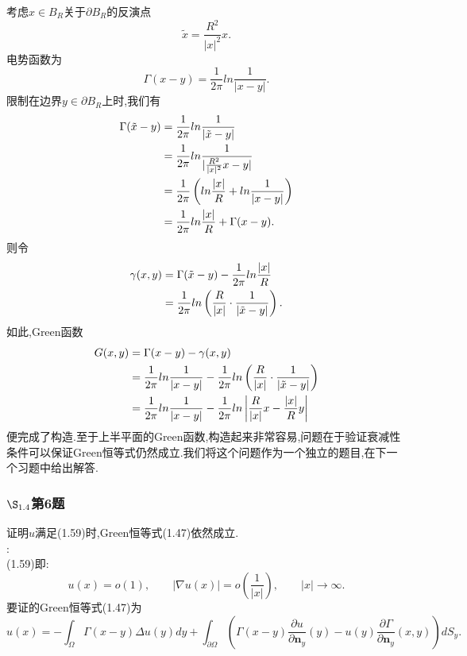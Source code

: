 \documentclass[12pt, a4paper]{ctexart}
\begin{document}
	考虑$x\in B_R$关于$\partial B_R$的反演点$$\tilde{x}=\frac{R^2 }{|x|^2}x.$$
	电势函数为$$
	\Gamma (x-y)=\frac{1}{2\pi}	ln\frac{1}{|x-y|}.$$
	限制在边界$y\in \partial B_R$上时,我们有
	\begin{align}
		\Gamma(\tilde{x}-y)&=\frac{1}{2\pi}	ln\frac{1}{|\tilde{x}-y|} \notag\\
		&=\frac{1}{2\pi} ln\frac{1}{|\frac{R^2 }{|x|^2}x-y|} \notag \\
		&=\frac{1}{2\pi} \left( ln\frac{|x|}{R}+ln \frac{1}{|x-y|} \right) \notag \\
		&=\frac{1}{2\pi} ln\frac{|x|}{R}+ \Gamma (x-y) \notag .
	\end{align}
	则令
	\begin{align}
		\gamma(x,y) &= \Gamma(\tilde{x}-y)-\frac{1}{2\pi} ln\frac{|x|}{R} \notag\\
		&= \frac{1}{2\pi} ln\left( \frac{R}{|x|} \cdot\frac{1}{|\tilde{x}-y|} \right)\notag.
	\end{align}
	如此,Green函数
	\begin{align}
		G(x,y)&=\Gamma(x-y) -\gamma(x,y)\notag\\
		&=\frac{1}{2\pi} ln\frac{1}{|x-y|}-\frac{1}{2\pi} ln\left( \frac{R}{|x|} \cdot\frac{1}{|\tilde{x}-y|}\right) \notag\\
		&= \frac{1}{2\pi} ln\frac{1}{|x-y|}- \frac{1}{2\pi} ln \left| \frac{R}{|x|}x-\frac{|x|}{R}y\right| \notag
	\end{align}
	便完成了构造.至于上半平面的Green函数,构造起来非常容易,问题在于验证衰减性条件可以保证Green恒等式仍然成立.我们将这个问题作为一个独立的题目,在下一个习题中给出解答.
	
	\subsubsection{$\S_{1.4}$第6题}
	\kaishu{}证明$u$满足(1.59)时,Green恒等式(1.47)依然成立.\\
	
	\songti{}:\\
	
	(1.59)即:$$
	u(x)=o(1),\qquad |\nabla u(x)|=o\left( \frac{1}{|x|} \right), \qquad |x| \to \infty.	$$
	要证的Green恒等式(1.47)为$$
	u(x)= -\int_{\Omega} \Gamma(x-y) \Delta u(y) dy + \int_{\partial \Omega} \left(\Gamma(x-y) \frac{\partial u}{\partial \bm{n}_y}(y) -u(y)\frac{\partial \Gamma}{\partial \bm{n}_y}(x,y)   \right) dS_y.	$$
	
	
\end{document}
